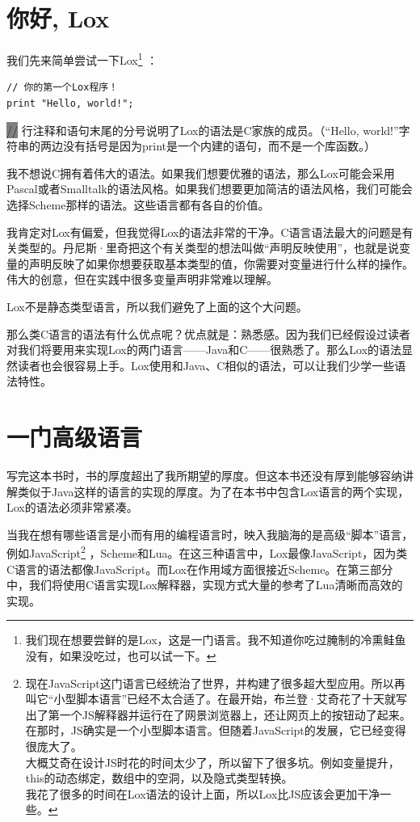 \documentclass[cn,10pt,math=newtx,citestyle=gb7714-2015,bibstyle=gb7714-2015]{elegantbook}
\begin{document}
\section{你好, Lox}

我们先来简单尝试一下Lox\footnote{我们现在想要尝鲜的是Lox，这是一门语言。我不知道你吃过腌制的冷熏鲑鱼没有，如果没吃过，也可以试一下。} ： 

\begin{verbatim}
// 你的第一个Lox程序！
print "Hello, world!";
\end{verbatim}

\colorbox{gray}{//} 行注释和语句末尾的分号说明了Lox的语法是C家族的成员。（“Hello, world!”字符串的两边没有括号是因为print是一个内建的语句，而不是一个库函数。）

我不想说C拥有着伟大的语法。如果我们想要优雅的语法，那么Lox可能会采用Pascal或者Smalltalk的语法风格。如果我们想要更加简洁的语法风格，我们可能会选择Scheme那样的语法。这些语言都有各自的价值。

\begin{tcolorbox}
我肯定对Lox有偏爱，但我觉得Lox的语法非常的干净。C语言语法最大的问题是有关类型的。丹尼斯·里奇把这个有关类型的想法叫做“声明反映使用”，也就是说变量的声明反映了如果你想要获取基本类型的值，你需要对变量进行什么样的操作。伟大的创意，但在实践中很多变量声明非常难以理解。

Lox不是静态类型语言，所以我们避免了上面的这个大问题。
\end{tcolorbox}

那么类C语言的语法有什么优点呢？优点就是：熟悉感。因为我们已经假设过读者对我们将要用来实现Lox的两门语言——Java和C——很熟悉了。那么Lox的语法显然读者也会很容易上手。Lox使用和Java、C相似的语法，可以让我们少学一些语法特性。

\section{一门高级语言}

写完这本书时，书的厚度超出了我所期望的厚度。但这本书还没有厚到能够容纳讲解类似于Java这样的语言的实现的厚度。为了在本书中包含Lox语言的两个实现，Lox的语法必须非常紧凑。

当我在想有哪些语言是小而有用的编程语言时，映入我脑海的是高级“脚本”语言，例如JavaScript\footnote{现在JavaScript这门语言已经统治了世界，并构建了很多超大型应用。所以再叫它“小型脚本语言”已经不太合适了。在最开始，布兰登·艾奇花了十天就写出了第一个JS解释器并运行在了网景浏览器上，还让网页上的按钮动了起来。在那时，JS确实是一个小型脚本语言。但随着JavaScript的发展，它已经变得很庞大了。 \\ 大概艾奇在设计JS时花的时间太少了，所以留下了很多坑。例如变量提升，this的动态绑定，数组中的空洞，以及隐式类型转换。 \\ 我花了很多的时间在Lox语法的设计上面，所以Lox比JS应该会更加干净一些。} ，Scheme和Lua。在这三种语言中，Lox最像JavaScript，因为类C语言的语法都像JavaScript。而Lox在作用域方面很接近Scheme。在第三部分中，我们将使用C语言实现Lox解释器，实现方式大量的参考了Lua清晰而高效的实现。
\end{document}
